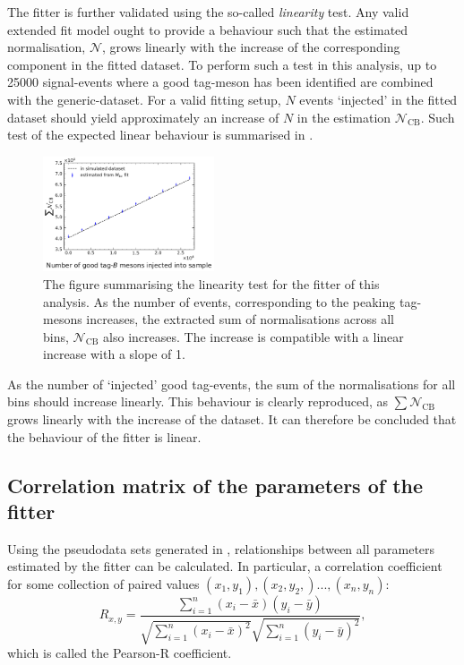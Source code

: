 The fitter is further validated using the so-called \textit{linearity} test.
Any valid extended fit model ought to provide a behaviour such that the estimated normalisation, $\mathcal{N}$, grows linearly with the increase of the corresponding component in the fitted dataset.
To perform such a test in this analysis, up to 25000 \BtoXsgamma signal-\MC events where a good tag-\B meson has been identified are combined with the generic-\MC dataset.
For a valid fitting setup, $N$ events `injected' in the fitted dataset should yield approximately an increase of $N$ in the estimation $\mathcal{N}_{\mathrm{CB}}$.
Such test of the expected linear behaviour is summarised in .

\begin{figure}[htbp!]
    \centering
    \includegraphics[width=0.45\textwidth]{figures/mc_validation/linearity_check_longer.pdf}
    \caption{\label{fig:linearity_test}The figure summarising the linearity test for the \Mbc fitter of this analysis.
    As the number of events, corresponding to the peaking tag-\B mesons increases, the extracted sum of normalisations across all bins, $\mathcal{N}_{\mathrm{CB}}$ also increases.
    The increase is compatible with a linear increase with a slope of 1.
    }
\end{figure}

As the number of `injected' good tag-\B events, the sum of the normalisations for all \EB bins should increase linearly.
This behaviour is clearly reproduced, as $\sum \mathcal{N}_{\mathrm{CB}}$ grows linearly with the increase of the dataset.
It can therefore be concluded that the behaviour of the \Mbc fitter is linear.

\subsection{Correlation matrix of the parameters of the \texorpdfstring{\Mbc}{Mbc} fitter}\label{sec:correlation_matrix}

Using the pseudodata sets generated in , relationships between all parameters estimated by the \Mbc fitter can be calculated.
In particular, a correlation coefficient for some collection of paired values ${(x_1,y_1),(x_2,y_2,)...,(x_n,y_n)}$:
\begin{equation}\label{eq:pearson_r}
    R_{x,y}=\frac{\sum_{i=1}^n\left(x_i-\bar{x}\right)\left(y_i-\bar{y}\right)}{\sqrt{\sum_{i=1}^n\left(x_i-\bar{x}\right)^2} \sqrt{\sum_{i=1}^n\left(y_i-\bar{y}\right)^2}},
\end{equation}
which is called the Pearson-R coefficient.

